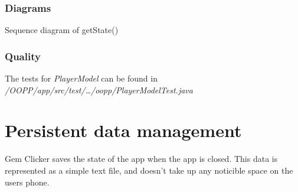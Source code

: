 \documentclass{article}
\begin{document}
\subsubsection{Diagrams}
\begin{center}
    Sequence diagram of getState()\\
\end{center}

\subsubsection{Quality}
The tests for \emph{PlayerModel} can be found in \emph{/OOPP/app/src/test/\ldots/oopp/PlayerModelTest.java}


\section{Persistent data management}
Gem Clicker saves the state of the app when the app is closed. 
This data is represented as a simple text file, and doesn't take up any noticible space on the users phone.
\end{document}
